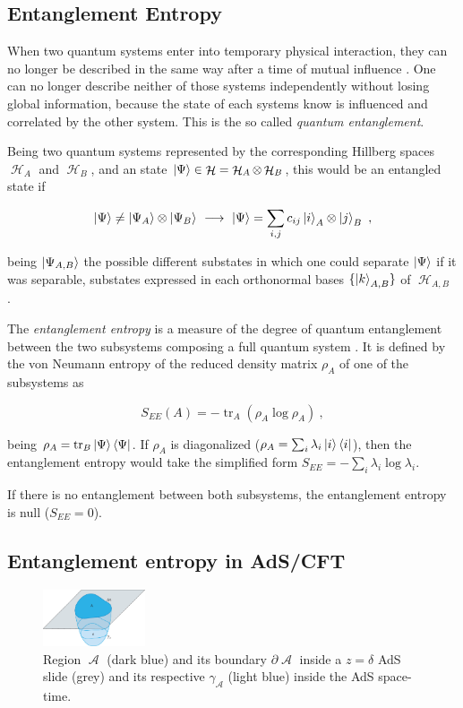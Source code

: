 \documentclass[lettersize,journal]{IEEEtran}
\providecommand{\eq}[2]{
    \begin{equation}
        #2
    \label{eq:#1}
    \end{equation}
}
\DeclareMathOperator{\calA}{\mathcal{A}}
\DeclareMathOperator{\calH}{\mathcal{H}}
\DeclareMathOperator{\tr}{tr}
\begin{document}
\subsection{Entanglement Entropy}

When two quantum systems enter into temporary physical interaction, they can no longer be described in the same way after a time of mutual influence \cite{schrodinger_discussion_1935}. One can no longer describe neither of those systems independently without losing global information, because the state of each systems know is influenced and correlated by the other system. This is the so called \textit{quantum entanglement}.

Being two quantum systems represented by the corresponding Hillberg spaces $\calH_A$ and $\calH_B$, and an state $\ket{\Psi} \in \calH = \calH_A \otimes \calH_B$, this would be an entangled state if
\eq{entanglement}{
    \ket{\Psi} \neq \ket{\Psi_A} \otimes \ket{\Psi_B} \ \longrightarrow \ \ket{\Psi} = \sum_{i,j} c_{ij} \ket{i}_A \otimes \ket{j}_B \ ,
}
being $\ket{\Psi_{A,B}}$ the possible different substates in which one could separate $\ket{\Psi}$ if it was separable, substates expressed in each orthonormal bases $\{ \ket{k}_{A,B} \}$ of $\calH_{A,B}$ \cite{}.

The \textit{entanglement entropy} is a measure of the degree of quantum entanglement between the two subsystems composing a full quantum system \cite{nishioka_entanglement_2018}. It is defined by the von
Neumann entropy of the reduced density matrix $\rho_A$ of one of the subsystems as
\eq{entanglement-entropy}{
    S_{EE}(A) = - \tr_A ( \rho_A \log \rho_A ) \ ,
}
being $\rho_A = \tr_B \ket{\Psi}\bra{\Psi}$. If $\rho_A$ is diagonalized ($\rho_A = \sum_i \lambda_i \ket{i}\bra{i}$), then the entanglement entropy would take the simplified form $S_{EE} = - \sum_i \lambda_i \log \lambda_i$.

If there is no entanglement between both subsystems, the entanglement entropy is null ($S_{EE} = 0$).


\subsection{Entanglement entropy in AdS/CFT}

\begin{figure}
    \centering
    \includegraphics[width=0.27\textwidth]{../Imatges/Extern/EE_AdS-CFT.png}
\caption{Region $\calA$ (dark blue) and its boundary $\partial \calA$ inside a $z=\delta$ AdS slide (grey) and its respective $\gamma_{\calA}$ (light blue) inside the AdS space-time.}
\label{fig:EE_AdS-CFT}
\end{figure}
\end{document}
